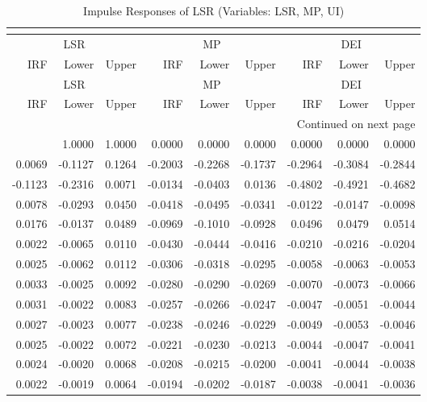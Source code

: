 \begin{longtable}{rrrrrrrrr}
\caption{Impulse Responses of LSR (Variables: LSR, MP, UI)}\\
\label{tab:lsr_irf_group1}\\
\toprule
\multicolumn{3}{c}{LSR} & \multicolumn{3}{c}{MP} & \multicolumn{3}{c}{DEI} \\
IRF & Lower & Upper & IRF & Lower & Upper & IRF & Lower & Upper \\
\midrule
\endfirsthead
\toprule
\multicolumn{3}{c}{LSR} & \multicolumn{3}{c}{MP} & \multicolumn{3}{c}{DEI} \\
IRF & Lower & Upper & IRF & Lower & Upper & IRF & Lower & Upper \\
\midrule
\endhead
\midrule
\multicolumn{9}{r}{Continued on next page} \\
\midrule
\endfoot
\bottomrule
\endlastfoot
1.0000 & 1.0000 & 1.0000 & 0.0000 & 0.0000 & 0.0000 & 0.0000 & 0.0000 & 0.0000 \\
0.0069 & -0.1127 & 0.1264 & -0.2003 & -0.2268 & -0.1737 & -0.2964 & -0.3084 & -0.2844 \\
-0.1123 & -0.2316 & 0.0071 & -0.0134 & -0.0403 & 0.0136 & -0.4802 & -0.4921 & -0.4682 \\
0.0078 & -0.0293 & 0.0450 & -0.0418 & -0.0495 & -0.0341 & -0.0122 & -0.0147 & -0.0098 \\
0.0176 & -0.0137 & 0.0489 & -0.0969 & -0.1010 & -0.0928 & 0.0496 & 0.0479 & 0.0514 \\
0.0022 & -0.0065 & 0.0110 & -0.0430 & -0.0444 & -0.0416 & -0.0210 & -0.0216 & -0.0204 \\
0.0025 & -0.0062 & 0.0112 & -0.0306 & -0.0318 & -0.0295 & -0.0058 & -0.0063 & -0.0053 \\
0.0033 & -0.0025 & 0.0092 & -0.0280 & -0.0290 & -0.0269 & -0.0070 & -0.0073 & -0.0066 \\
0.0031 & -0.0022 & 0.0083 & -0.0257 & -0.0266 & -0.0247 & -0.0047 & -0.0051 & -0.0044 \\
0.0027 & -0.0023 & 0.0077 & -0.0238 & -0.0246 & -0.0229 & -0.0049 & -0.0053 & -0.0046 \\
0.0025 & -0.0022 & 0.0072 & -0.0221 & -0.0230 & -0.0213 & -0.0044 & -0.0047 & -0.0041 \\
0.0024 & -0.0020 & 0.0068 & -0.0208 & -0.0215 & -0.0200 & -0.0041 & -0.0044 & -0.0038 \\
0.0022 & -0.0019 & 0.0064 & -0.0194 & -0.0202 & -0.0187 & -0.0038 & -0.0041 & -0.0036 \\
\end{longtable}